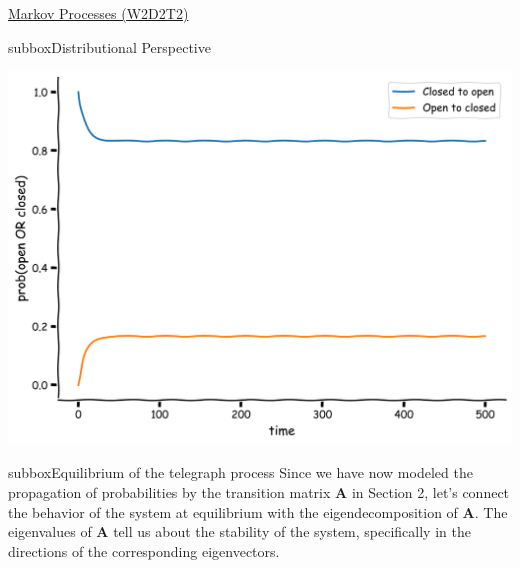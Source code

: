 \begin{textbox}{\href{https://colab.research.google.com/github/NeuromatchAcademy/course-content/blob/master/tutorials/W2D2_LinearSystems/student/W2D2_Tutorial2.ipynb}{Markov Processes (W2D2T2)} }
\begin{subbox}{subbox}{Distributional Perspective}
\begin{center}
\includegraphics[scale=0.1]{Figures/LS/MC_Figure5.png}
\end{center}

\end{subbox}
\begin{subbox}{subbox}{Equilibrium of the telegraph process}
\scriptsize
Since we have now modeled the propagation of probabilities by the transition matrix $\mathbf{A}$ in Section 2, let's connect the behavior of the system at equilibrium with the eigendecomposition of $\mathbf{A}$.
The eigenvalues of $\mathbf{A}$ tell us about the stability of the system, specifically in the directions of the corresponding eigenvectors.

\end{subbox}
\end{textbox}
